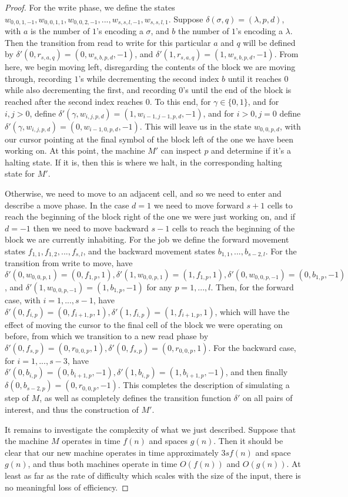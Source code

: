 \begin{proof}
	For the write phase, we define the states $w_{0,0,1,-1},w_{0,0,1,1},w_{0,0,2,-1},...,w_{s,s,l,-1},w_{s,s,l,1}$. Suppose $\delta(\sigma,q) = (\lambda,p,d)$, with $a$ is the number of $1$'s encoding a $\sigma$, and $b$ the number of $1$'s encoding a $\lambda$. Then the transition from read to write for this particular $a$ and $q$ will be defined by $\delta'(0,r_{s,a,q}) = (0,w_{s,b,p,d},-1)$, and $\delta'(1,r_{s,a,q}) = (1,w_{s,b,p,d},-1)$. From here, we begin moving left, disregarding the contents of the block we are moving through, recording $1$'s while decrementing the second index $b$ until it reaches $0$ while also decrementing the first, and recording $0$'s until the end of the block is reached after the second index reaches $0$. To this end, for $\gamma \in \{0,1\}$, and for $i,j>0$, define $\delta'(\gamma,w_{i,j,p,d}) = (1,w_{i-1,j-1,p,d},-1)$, and for $i>0,j=0$ define $\delta'(\gamma,w_{i,j,p,d}) = (0,w_{i-1,0,p,d},-1)$. This will leave us in the state $w_{0,0,p,d}$, with our cursor pointing at the final symbol of the block left of the one we have been working on. At this point, the machine $M'$ can inspect $p$ and determine if it's a halting state. If it is, then this is where we halt, in the corresponding halting state for $M'$. 

	Otherwise, we need to move to an adjacent cell, and so we need to enter and describe a move phase. In the case $d=1$ we need to move forward $s+1$ cells to reach the beginning of the block right of the one we were just working on, and if $d=-1$ then we need to move backward $s-1$ cells to reach the beginning of the block we are currently inhabiting. For the job we define the forward movement states $f_{1,1},f_{1,2},...,f_{s,l}$, and the backward movement states $b_{1,1},...,b_{s-2,l}$. For the transition from write to move, have $\delta'(0,w_{0,0,p,1}) = (0,f_{1,p},1),\delta'(1,w_{0,0,p,1}) = (1,f_{1,p},1), \delta'(0,w_{0,0,p,-1}) = (0,b_{1,p},-1)$, and $\delta'(1,w_{0,0,p,-1}) = (1,b_{1,p},-1)$ for any $p = 1,...,l$. Then, for the forward case, with $i=1,...,s-1$, have $\delta'(0,f_{i,p}) = (0,f_{i+1,p},1),\delta'(1,f_{i,p}) = (1,f_{i+1,p},1)$, which will have the effect of moving the cursor to the final cell of the block we were operating on before, from which we transition to a new read phase by $\delta'(0,f_{s,p}) = (0,r_{0,0,p},1),\delta'(0,f_{s,p}) = (0,r_{0,0,p},1)$. For the backward case, for $i=1,...,s-3$, have $\delta'(0,b_{i,p}) = (0,b_{i+1,p},-1),\delta'(1,b_{i,p}) = (1,b_{i+1,p},-1)$, and then finally $\delta(0,b_{s-2,p}) = (0,r_{0,0,p},-1)$. This completes the description of simulating a step of $M$, as well as completely defines the transition function $\delta'$ on all pairs of interest, and thus the construction of $M'$.

	It remains to investigate the complexity of what we just described. Suppose that the machine $M$ operates in time $f(n)$ and spaces $g(n)$. Then it should be clear that our new machine operates in time approximately $3sf(n)$ and space $g(n)$, and thus both machines operate in time $O(f(n))$ and $O(g(n))$. At least as far as the rate of difficulty which scales with the size of the input, there is no meaningful loss of efficiency. 
\end{proof}
